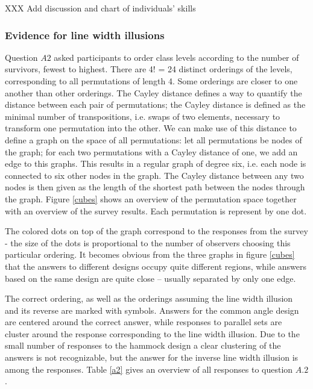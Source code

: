 XXX Add discussion and chart of individuals' skills



\subsubsection{Evidence for line width illusions}

Question $A2$ asked participants to order  class levels  according to the number of survivors, fewest to highest. There are 4! = 24 distinct orderings of the levels, corresponding to all permutations of length 4. Some orderings are closer to one another than other orderings. The Cayley distance defines a way to quantify the distance between  each pair of permutations; the Cayley distance is defined as the minimal number of transpositions, i.e. swaps of two elements,  necessary to transform one permutation into the other.
We can make use of this distance to define a graph on the space of all permutations: let all permutations be nodes of the graph; for each two permutations with a Cayley distance of one, we add an edge to this graphs. This results in a regular graph of degree six, i.e. each  node is connected to six other nodes in the graph. The Cayley distance between any two nodes is then given as the length of the shortest path between the nodes through the graph.
Figure \ref{cubes} shows an overview of the permutation space together with an overview of the survey results. Each permutation is represent by one dot. 

The colored dots on top of the graph correspond to the responses from the survey - the size of the dots is proportional to the number of observers choosing this particular ordering. It becomes obvious from the three graphs in figure \ref{cubes} that
the answers to different designs occupy quite different regions, while answers based  on the same design are quite close --  usually separated by only one edge. 

The correct ordering, as well as the orderings assuming the line width illusion and its reverse are marked with symbols. Answers for the common angle design are centered around the correct answer, while responses to parallel sets are cluster around the response corresponding to the line width illusion. Due to the small number of responses to the hammock design a clear clustering of the answers is not recognizable, but the answer for the inverse line width illusion is among the responses. Table \ref{a2} gives an overview of all responses to question $A.2$. 

